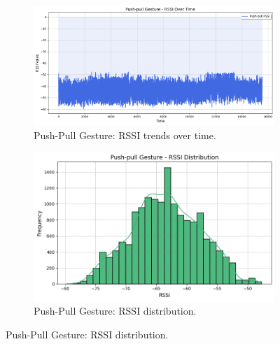 \documentclass[10pt,twocolumn,letterpaper]{article}
\begin{document}
\begin{figure}[t]
  \begin{subfigure}{0.45\linewidth}
    \centering
    \includegraphics[width=\linewidth]{figures/push_pull_rssi_trends.png}
    \caption{Push-Pull Gesture: RSSI trends over time.}
    \label{fig:push_pull_rssi_trends}
  \end{subfigure}
  \hfill
  \begin{subfigure}{0.45\linewidth}
    \centering
    \includegraphics[width=\linewidth]{figures/push_pull_rssi_distribution.png}
    \caption{Push-Pull Gesture: RSSI distribution.}
    \label{fig:push_pull_rssi_distribution}
  \end{subfigure}

  \vspace{0.5cm} %


\end{figure}
\end{document}
